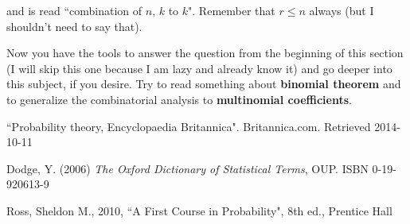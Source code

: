 \documentclass[a4paper,twocolumn]{article}
\begin{document}
\noindent and is read ``combination of $n$, $k$ to $k$". Remember that $r \leq n$ always (but I shouldn't need to say that).

Now you have the tools to answer the question from the beginning of this section (I will skip this one because I am lazy and already know it) and go deeper into this subject, if you desire. Try to read something about \textbf{binomial theorem} and to generalize the combinatorial analysis to \textbf{multinomial coefficients}.


\begin{thebibliography}{9}
         ``Probability theory, Encyclopaedia Britannica".
         Britannica.com.
         Retrieved 2014-10-11

        Dodge, Y. (2006)
        \textit{The Oxford Dictionary of Statistical Terms}, OUP.
        ISBN 0-19-920613-9

        Ross, Sheldon M.,
        2010,
        ``A First Course in Probability", 8th ed.,
        Prentice Hall
\end{thebibliography}
\end{document}
